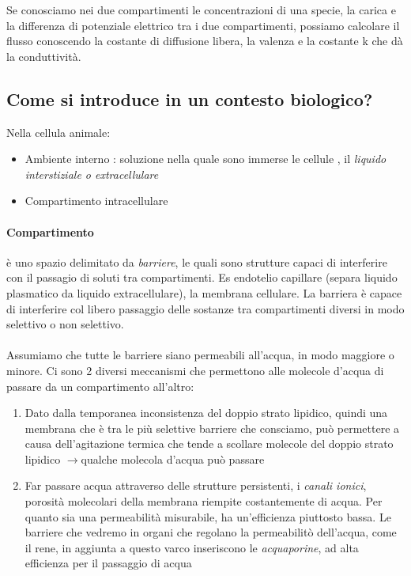 \documentclass[a4paper,12pt]{article}
\newcommand{\lfreccia}{\ensuremath{\longrightarrow}}
\begin{document}
Se conosciamo nei due compartimenti le concentrazioni di una specie, la carica e la differenza di  potenziale elettrico tra i due compartimenti, possiamo calcolare il flusso conoscendo la costante di diffusione libera, la valenza e la costante k che dà la conduttività.

\subsection{Come si introduce in un contesto biologico?}

Nella cellula animale:

\begin{itemize}
\item{Ambiente interno : soluzione nella quale sono immerse le cellule , il \emph{liquido interstiziale o extracellulare}}
\item{Compartimento intracellulare}
\end{itemize} 

\paragraph{Compartimento} è uno spazio delimitato da \emph{barriere}, le quali sono strutture capaci di interferire con il passagio di soluti tra compartimenti. Es endotelio capillare (separa liquido plasmatico da liquido extracellulare), la membrana cellulare. La barriera è capace di interferire col libero passaggio delle sostanze tra compartimenti diversi in modo selettivo o non selettivo.
\paragraph{}
Assumiamo che tutte le barriere siano permeabili all'acqua, in modo maggiore o minore. Ci sono 2 diversi meccanismi che permettono alle molecole d'acqua di passare da un compartimento all'altro: 
\begin{enumerate}
\item{Dato dalla temporanea inconsistenza del doppio strato lipidico, quindi una membrana che è tra le più selettive barriere che consciamo, può permettere a causa dell'agitazione termica che tende a scollare molecole del doppio strato lipidico \lfreccia qualche  molecola d'acqua può passare}
\item{Far passare acqua attraverso delle strutture persistenti, i \emph{canali ionici}, porosità molecolari della membrana riempite costantemente di acqua. Per quanto sia una permeabilità misurabile, ha un'efficienza piuttosto bassa. Le barriere che vedremo in organi che regolano la permeabilitò dell'acqua, come il rene, in aggiunta a questo varco inseriscono le \emph{acquaporine}, ad alta efficienza per il passaggio di acqua}
\end{enumerate}
 
\end{document}
